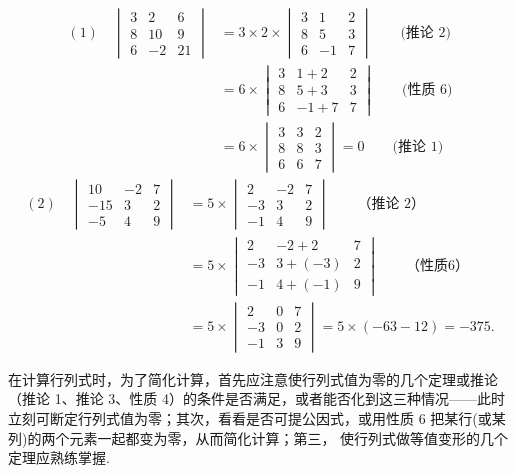 \begin{solution}
\[\begin{split}
(1)\quad \begin{vmatrix}3&2&6\\8&10&9\\6&-2&21\end{vmatrix}&=3\times2\times\begin{vmatrix}3&1&2\\8&5&3\\6&-1&7\end{vmatrix}\qquad\text{(推论 2)}\\
&=6\times \begin{vmatrix} 3& 1+ 2& 2\\ 8& 5+ 3& 3\\ 6& - 1+ 7& 7\end{vmatrix} \qquad \text{(性质 6)} \\
&= 6\times \begin{vmatrix} 3& 3& 2\\ 8& 8& 3\\ 6& 6& 7\end{vmatrix} = 0 \qquad \text{(推论 1)}
\end{split}\]
\[\begin{split}
  (2)\quad \begin{vmatrix} 10& - 2& 7\\ - 15& 3& 2\\ - 5& 4& 9\end{vmatrix} &=5\times \begin{vmatrix} 2& - 2& 7\\ - 3& 3& 2\\ - 1& 4& 9\end{vmatrix} \qquad \text{（推论 2）}\\
  &=5\times \begin{vmatrix} 2& - 2+2& 7\\ - 3& 3+(-3)& 2\\ - 1& 4+(-1)& 9\end{vmatrix} \qquad \text{（性质6）}\\
  &=5\times \begin{vmatrix} 2& 0& 7\\ - 3& 0& 2\\ - 1& 3& 9\end{vmatrix} =5\times (-63-12)=-375.
\end{split}\]
\end{solution}

\begin{note}
在计算行列式时，为了简化计算，首先应注意使行列式值为零的几个定理或推论（推论 1、推论 3、性质 4）的条件是否满足，或者能否化到这三种情况——此时立刻可断定行列式值为零；其次，看看是否可提公因式，或用性质 6 把某行(或某列)的两个元素一起都变为零，从而简化计算；第三， 使行列式做等值变形的几个定理应熟练掌握.
\end{note}

